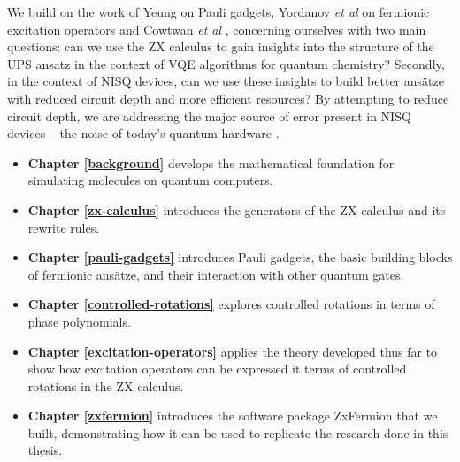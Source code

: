 We build on the work of Yeung \cite{Yeung2020} on Pauli gadgets, Yordanov \textit{et al} \cite{Yordanov2020} on fermionic excitation operators and Cowtwan \textit{et al} \cite{Cowtan2020}, concerning ourselves with two main questions: can we use the ZX calculus to gain insights into the structure of the UPS ansatz in the context of VQE algorithms for quantum chemistry? Secondly, in the context of NISQ devices, can we use these insights to build better ansätze with reduced circuit depth and more efficient resources? By attempting to reduce circuit depth, we are addressing the major source of error present in NISQ devices -- the noise of today's quantum hardware \cite{Cowtan2020}.

\begin{itemize}
    \item \textbf{Chapter \ref{background}} develops the mathematical foundation for simulating molecules on quantum computers.
    \item \textbf{Chapter \ref{zx-calculus}} introduces the generators of the ZX calculus and its rewrite rules.
    \item \textbf{Chapter \ref{pauli-gadgets}} introduces Pauli gadgets, the basic building blocks of fermionic ansätze, and their interaction with other quantum gates.
    \item \textbf{Chapter \ref{controlled-rotations}} explores controlled rotations in terms of phase polynomials.
    \item \textbf{Chapter \ref{excitation-operators}} applies the theory developed thus far to show how excitation operators can be expressed it terms of controlled rotations in the ZX calculus.
    \item \textbf{Chapter \ref{zxfermion}} introduces the software package ZxFermion that we built, demonstrating how it can be used to replicate the research done in this thesis.
\end{itemize}
